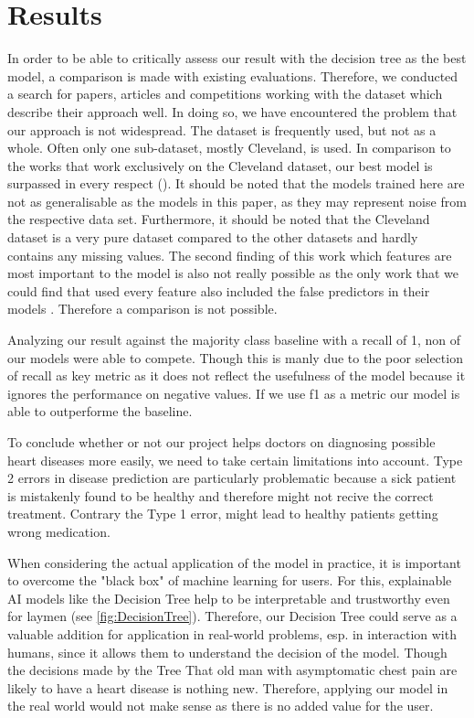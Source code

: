 
\section{Results} \label{sec:results}

In order to be able to critically assess our result with the decision tree as the best model, a comparison is made with existing evaluations. Therefore, we conducted a search for papers, articles and competitions working with the dataset which describe their approach well. In doing so, we have encountered the problem that our approach is not widespread. The dataset is frequently used, but not as a whole. Often only one sub-dataset, mostly Cleveland, is used.  In comparison to the works that work exclusively on the Cleveland dataset, our best model is surpassed in every respect (\cite{Ayatollahi2019,alotaibi2019, uyar2017}). It should be noted that the models trained here are not as generalisable as the models in this paper, as they may represent noise from the respective data set. Furthermore, it should be noted that the Cleveland dataset is a very pure dataset compared to the other datasets and hardly contains any missing values. 
The second finding of this work which features are most important to the model is also not really possible as the only work that we could find that used every feature also included the false predictors in their models \cite{garate-escamila2020}. Therefore a comparison is not possible. 


Analyzing our result against the majority class baseline with a recall of 1, non of our models were able to compete. Though this is manly due to the poor selection of recall as key metric as it does not reflect the usefulness of the model because it ignores the performance on negative values. If we use f1 as a metric our model is able to outperforme the baseline. 

To conclude whether or not our project helps doctors on diagnosing possible heart diseases more easily, we need to take certain limitations into account. Type 2 errors in disease prediction are particularly problematic because a sick patient is mistakenly found to be healthy and therefore might not recive the correct treatment. Contrary the Type 1 error, might lead to healthy patients getting wrong medication.   

When considering the actual application of the model in practice, it is important to overcome the "black box" of machine learning for users. For this, explainable AI models like the Decision Tree help to be interpretable and trustworthy even for laymen (see \cref{fig:DecisionTree}). Therefore, our Decision Tree could serve as a valuable addition for application in real-world problems, esp. in interaction with humans, since it allows them to understand the decision of the model. Though the decisions made by the Tree That old man with asymptomatic chest pain are likely to have a heart disease is nothing new. Therefore, applying our model in the real world would not make sense as there is no added value for the user. 